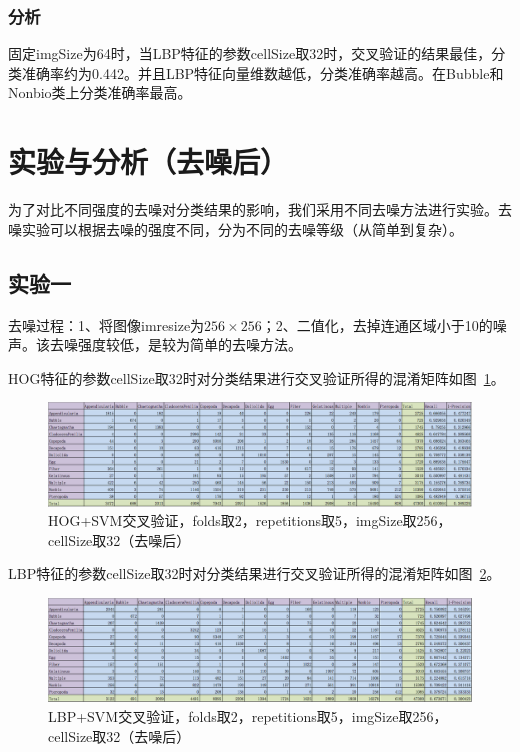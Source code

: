 \documentclass[12pt]{article}
\begin{document}
\subsubsection{分析}

固定imgSize为64时，当LBP特征的参数cellSize取32时，交叉验证的结果最佳，分类准确率约为0.442。并且LBP特征向量维数越低，分类准确率越高。在Bubble和Nonbio类上分类准确率最高。


\section{实验与分析（去噪后）}
为了对比不同强度的去噪对分类结果的影响，我们采用不同去噪方法进行实验。去噪实验可以根据去噪的强度不同，分为不同的去噪等级（从简单到复杂）。

\subsection{实验一}
去噪过程：1、将图像imresize为$256 \times 256$；2、二值化，去掉连通区域小于10的噪声。该去噪强度较低，是较为简单的去噪方法。

HOG特征的参数cellSize取32时对分类结果进行交叉验证所得的混淆矩阵如图~\ref{fig:HOG-SVM-2-folds-5-repetitions-32-256-1}。
\begin{figure}[!ht]
\centering
\includegraphics[width=1.0\linewidth]{HOG-SVM-2-folds-5-repetitions-32-256-1}
\caption{HOG+SVM交叉验证，folds取2，repetitions取5，imgSize取256，cellSize取32（去噪后）}
\label{fig:HOG-SVM-2-folds-5-repetitions-32-256-1}
\end{figure}

LBP特征的参数cellSize取32时对分类结果进行交叉验证所得的混淆矩阵如图~\ref{fig:LBP-SVM-2-folds-5-repetitions-32-256-1}。
\begin{figure}[!ht]
\centering
\includegraphics[width=1.0\linewidth]{LBP-SVM-2-folds-5-repetitions-32-256-1}
\caption{LBP+SVM交叉验证，folds取2，repetitions取5，imgSize取256，cellSize取32（去噪后）}
\label{fig:LBP-SVM-2-folds-5-repetitions-32-256-1}
\end{figure}
\end{document}
